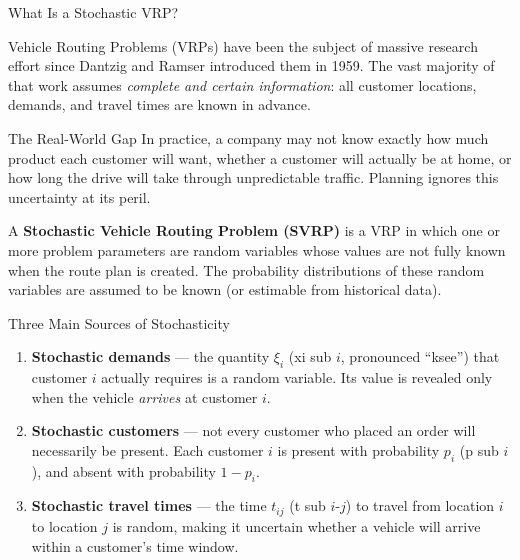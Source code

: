\documentclass[aspectratio=169,10pt]{beamer}
\begin{document}
\begin{frame}[allowframebreaks]{What Is a Stochastic VRP?}

  Vehicle Routing Problems (VRPs) have been the subject of massive research
  effort since Dantzig and Ramser introduced them in 1959.
  The vast majority of that work assumes \emph{complete and certain
  information}: all customer locations, demands, and travel times are known
  in advance.

  \begin{alertblock}{The Real-World Gap}
    In practice, a company may not know exactly how much product each customer
    will want, whether a customer will actually be at home, or how long the
    drive will take through unpredictable traffic.
    Planning ignores this uncertainty at its peril.
  \end{alertblock}

  A \textbf{Stochastic Vehicle Routing Problem (SVRP)} is a VRP in which one
  or more problem parameters are random variables whose values are not fully
  known when the route plan is created.
  The probability distributions of these random variables are assumed to be
  known (or estimable from historical data).

  \framebreak

  \begin{block}{Three Main Sources of Stochasticity}
    \begin{enumerate}
      \item \textbf{Stochastic demands} --- the quantity $\xi_i$ (xi sub $i$,
            pronounced ``ksee'') that customer $i$ actually requires is a
            random variable.  Its value is revealed only when the vehicle
            \emph{arrives} at customer $i$.

      \item \textbf{Stochastic customers} --- not every customer who placed an
            order will necessarily be present.  Each customer $i$ is present
            with probability $p_i$ (p sub $i$), and absent with probability
            $1-p_i$.

      \item \textbf{Stochastic travel times} --- the time $t_{ij}$ (t sub
            $i$-$j$) to travel from location $i$ to location $j$ is random,
            making it uncertain whether a vehicle will arrive within a
            customer's time window.
    \end{enumerate}
  \end{block}


\end{frame}
\end{document}
